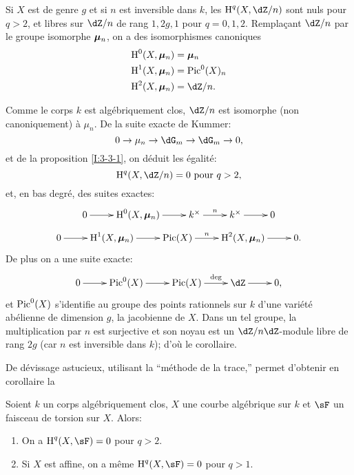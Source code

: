 \begin{corollary}\label{I:3-3-5}
Si $X$ est de genre $g$ et si $n$ est inversible dans $k$, les 
$\h^q(X,\dZ/n)$ sont nuls pour $q>2$, et libres sur $\dZ/n$ de rang $1,2 g,1$ 
pour $q=0,1,2$. Remplaçant $\dZ/n$ par le groupe isomorphe ${\bm\mu}_n$, on a des 
isomorphismes canoniques 
\begin{align*}
  \h^0(X,\dmu_n) &= \dmu_n \\
  \h^1(X,\dmu_n) &= \pic^0(X)_n \\
  \h^2(X,\dmu_n) &= \dZ/n \text{.}
\end{align*}
\end{corollary}

Comme le corps $k$ est algébriquement clos, $\dZ/n$ est isomorphe (non 
canoniquement) à $\mu_n$. De la suite exacte de Kummer:
\[
  0 \to \mu_n \to \dG_m \to \dG_m \to 0\text{,}
\]
et de la proposition \ref{I:3-3-1}, on déduit les égalité:
\[
  \h^q(X,\dZ/n) = 0 \text{ pour $q>2$,}
\]
et, en bas degré, des suites exactes:
\[\xymatrix{
  0 \ar[r] 
    & \h^0(X,\dmu_n) \ar[r] 
    & k^\times \ar[r]^-n 
    & k^\times \ar[r] 
    & 0
}\]
\[\xymatrix{
  0 \ar[r] 
    & \h^1(X,\dmu_n) \ar[r] 
    & \pic(X) \ar[r]^-n 
    & \h^2(X,\dmu_n) \ar[r] 
    & 0\text{.}
}\]
De plus on a une suite exacte:
\[\xymatrix{
  0 \ar[r] 
    & \pic^0(X) \ar[r] 
    & \pic(X) \ar[r]^-{\deg}
    & \dZ \ar[r] 
    & 0 \text{,}
}\]
et $\operatorname{Pic}^0(X)$ s'identifie au groupe des points rationnels sur $k$ d'une 
variété abélienne de dimension $g$, la jacobienne de $X$. Dans un tel 
groupe, la multiplication par $n$ est surjective et son noyau est un 
$\dZ/n\dZ$-module libre de rang $2 g$ (car $n$ est inversible dans $k$); d'où 
le corollaire. 

De dévissage astucieux, utilisant la ``méthode de la trace,'' permet 
d'obtenir en corollaire la 





\begin{proposition}\label{I:3-3-6}
Soient $k$ un corps algébriquement clos, $X$ une courbe algébrique sur $k$ 
et $\sF$ un faisceau de torsion sur $X$. Alors:
\begin{enumerate}[\indent i)]
  \item On a $\h^q(X,\sF) = 0$ pour $q>2$.
  \item Si $X$ est affine, on a même $\h^q(X,\sF) = 0$ pour $q>1$.
\end{enumerate}
\end{proposition}

